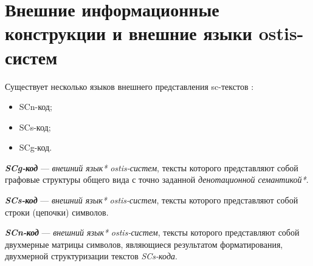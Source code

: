 \section{Внешние информационные конструкции и внешние языки ostis-систем}
\label{sec_external_information_constructs_external_lang}

Существует несколько языков внешнего представления sc-текстов :

\begin{itemize}
    \item SCn-код;
    \item SCs-код;
    \item SCg-код.
\end{itemize}

\textit{\textbf{SCg-код}} --- \textit{внешний язык*} \textit{ostis-систем}, тексты которого представляют собой графовые структуры общего вида с точно заданной \textit{денотационной семантикой*}.

\begin{SCn}

    \begin{scnindent}
    \end{scnindent}

\end{SCn}

\textit{\textbf{SCs-код}} --- \textit{внешний язык*} \textit{ostis-систем}, тексты которого представляют собой строки (цепочки) символов.

\begin{SCn}

    \begin{scnindent}
    \end{scnindent}

\end{SCn}

\textit{\textbf{SCn-код}} --- \textit{внешний язык*} \textit{ostis-систем}, тексты которого представляют собой двухмерные матрицы символов, являющиеся результатом форматирования, двухмерной структуризации текстов \textit{SCs-кода}.

\begin{SCn}

    \begin{scnindent}
    \end{scnindent}

\end{SCn}

